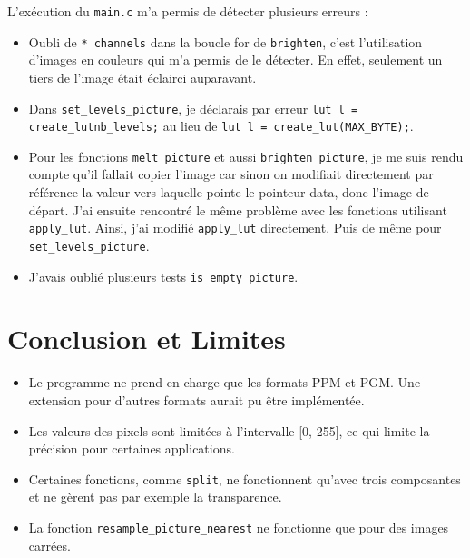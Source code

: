 \documentclass[a4paper,12pt]{article}
\begin{document}
L'exécution du \texttt{main.c} m'a permis de détecter plusieurs erreurs : 
\begin{itemize}
    \item Oubli de \texttt{* channels} dans la boucle for de \texttt{brighten}, c'est l'utilisation d'images en couleurs qui m'a permis de le détecter. En effet, seulement un tiers de l'image était éclairci auparavant.
    \item Dans \texttt{set\_levels\_picture}, je déclarais par erreur \texttt{lut l = create\_lut{nb\_levels};} au lieu de \texttt{lut l = create\_lut(MAX\_BYTE);}.
    \item Pour les fonctions \texttt{melt\_picture} et aussi \texttt{brighten\_picture}, je me suis rendu compte qu'il fallait copier l'image car sinon on modifiait directement par référence la valeur vers laquelle pointe le pointeur data, donc l'image de départ. J'ai ensuite rencontré le même problème avec les fonctions utilisant \texttt{apply\_lut}. Ainsi, j'ai modifié \texttt{apply\_lut} directement. Puis de même pour \texttt{set\_levels\_picture}.
    \item J'avais oublié plusieurs tests \texttt{is\_empty\_picture}.
\end{itemize}

\newpage

\section{Conclusion et Limites}
\begin{itemize}
    \item Le programme ne prend en charge que les formats PPM et PGM. Une extension pour d'autres formats aurait pu être implémentée.
    \item Les valeurs des pixels sont limitées à l'intervalle [0, 255], ce qui limite la précision pour certaines applications.
    \item Certaines fonctions, comme \texttt{split}, ne fonctionnent qu'avec trois composantes et ne gèrent pas par exemple la transparence.
    \item La fonction \texttt{resample\_picture\_nearest} ne fonctionne que pour des images carrées.
\end{itemize}

\newpage
\appendix
\end{document}
